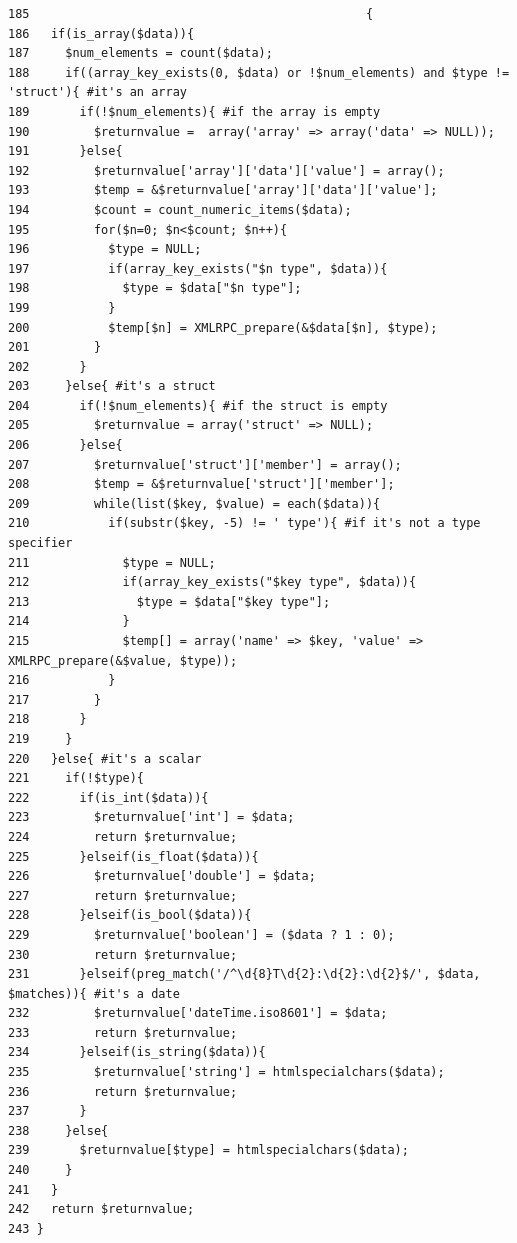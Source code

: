 \begin{Code}\begin{verbatim}185                                               {
186   if(is_array($data)){
187     $num_elements = count($data);
188     if((array_key_exists(0, $data) or !$num_elements) and $type != 'struct'){ #it's an array
189       if(!$num_elements){ #if the array is empty
190         $returnvalue =  array('array' => array('data' => NULL));
191       }else{
192         $returnvalue['array']['data']['value'] = array();
193         $temp = &$returnvalue['array']['data']['value'];
194         $count = count_numeric_items($data);
195         for($n=0; $n<$count; $n++){
196           $type = NULL;
197           if(array_key_exists("$n type", $data)){
198             $type = $data["$n type"];
199           }
200           $temp[$n] = XMLRPC_prepare(&$data[$n], $type);
201         }
202       }
203     }else{ #it's a struct
204       if(!$num_elements){ #if the struct is empty
205         $returnvalue = array('struct' => NULL);
206       }else{
207         $returnvalue['struct']['member'] = array();
208         $temp = &$returnvalue['struct']['member'];
209         while(list($key, $value) = each($data)){
210           if(substr($key, -5) != ' type'){ #if it's not a type specifier
211             $type = NULL;
212             if(array_key_exists("$key type", $data)){
213               $type = $data["$key type"];
214             }
215             $temp[] = array('name' => $key, 'value' => XMLRPC_prepare(&$value, $type));
216           }
217         }
218       }
219     }
220   }else{ #it's a scalar
221     if(!$type){
222       if(is_int($data)){
223         $returnvalue['int'] = $data;
224         return $returnvalue;
225       }elseif(is_float($data)){
226         $returnvalue['double'] = $data;
227         return $returnvalue;
228       }elseif(is_bool($data)){
229         $returnvalue['boolean'] = ($data ? 1 : 0);
230         return $returnvalue;
231       }elseif(preg_match('/^\d{8}T\d{2}:\d{2}:\d{2}$/', $data, $matches)){ #it's a date
232         $returnvalue['dateTime.iso8601'] = $data;
233         return $returnvalue;
234       }elseif(is_string($data)){
235         $returnvalue['string'] = htmlspecialchars($data);
236         return $returnvalue;
237       }
238     }else{
239       $returnvalue[$type] = htmlspecialchars($data);
240     }
241   }
242   return $returnvalue;
243 }
\end{verbatim}
\end{Code}




